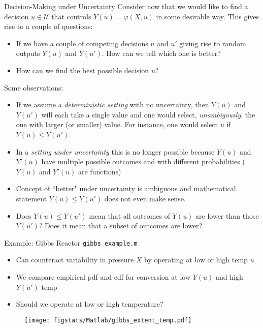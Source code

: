 \documentclass[9pt]{beamer}
\begin{document}
%
\begin{frame}{Decision-Making under Uncertainty}
Consider now that we would like to find a decision $u\in \mathcal{U}$ that controls $Y(u)=\varphi(X,u)$ in some desirable way. This gives rise to a couple of questions:
\begin{block}{}
\begin{itemize}
 \setlength{\itemsep}{5pt}
\item If we have a couple of competing decisions $u$ and $u'$ giving rise to random outputs $Y(u)$ and $Y(u')$. How can we tell which one is better? 

\item How can we find the best possible decision $u$?
\end{itemize}
\end{block}
Some observations: 
\begin{itemize}
 \setlength{\itemsep}{5pt}
\item If we assume a {\em deterministic setting} with no uncertainty, then $Y(u)$ and $Y(u')$ will each take a single value and one would select, {\em unambigously},  the one with larger (or smaller) value. For instance, one would select $u$ if $Y(u)\leq Y(u')$.   

\item In a {\em setting under uncertainty} this is no longer possible because $Y(u)$ and $Y'(u)$ have multiple possible outcomes and with different probabilities ($Y(u)$ and $Y'(u)$ are functions)

\item Concept of ``better" under uncertainty is ambiguous and mathematical statement $Y(u)\leq Y(u')$ does not even make sense. 

\item Does $Y(u)\leq Y(u')$ mean that all outcomes of $Y(u)$ are lower than those $Y(u')$? Does it mean that a subset of outcomes are lower? 
\end{itemize}

\end{frame}

\begin{frame}{Example: Gibbs Reactor \footnotesize{\texttt{gibbs\_example.m}}}
\begin{itemize}
 \setlength{\itemsep}{5pt}
\item Can counteract variability in pressure $X$ by operating at low or high temp $u$
\item We compare empirical pdf and cdf for conversion at low $Y(u)$ and high $Y(u')$ temp
\item Should we operate at low or high temperature?
\end{itemize}
\begin{figure}[!htb]
    \centering
	\texttt{[image: figstats/Matlab/gibbs\_extent\_temp.pdf]}
\end{figure}

\end{frame}
\end{document}
